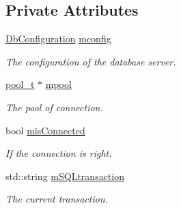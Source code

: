 \subsection*{Private Attributes}
\begin{DoxyCompactItemize}
\item 
\hypertarget{classPOSTGREDatabase_a83b42bf33f2daccada9d726d8100b3e5}{
\hyperlink{classDbConfiguration}{DbConfiguration} \hyperlink{classPOSTGREDatabase_a83b42bf33f2daccada9d726d8100b3e5}{mconfig}}
\label{classPOSTGREDatabase_a83b42bf33f2daccada9d726d8100b3e5}

\begin{DoxyCompactList}\small\item\em The configuration of the database server. \item\end{DoxyCompactList}\item 
\hypertarget{classPOSTGREDatabase_a85ab525b03e95ac8871bcc9d5601f641}{
\hyperlink{structPOSTGREDatabase_1_1pool__t}{pool\_\-t} $\ast$ \hyperlink{classPOSTGREDatabase_a85ab525b03e95ac8871bcc9d5601f641}{mpool}}
\label{classPOSTGREDatabase_a85ab525b03e95ac8871bcc9d5601f641}

\begin{DoxyCompactList}\small\item\em The pool of connection. \item\end{DoxyCompactList}\item 
\hypertarget{classPOSTGREDatabase_aa4f59d325b41b9b328878323c9589ac4}{
bool \hyperlink{classPOSTGREDatabase_aa4f59d325b41b9b328878323c9589ac4}{misConnected}}
\label{classPOSTGREDatabase_aa4f59d325b41b9b328878323c9589ac4}

\begin{DoxyCompactList}\small\item\em If the connection is right. \item\end{DoxyCompactList}\item 
\hypertarget{classPOSTGREDatabase_a8be0fe1af42ae6713524210d5e623a3a}{
std::string \hyperlink{classPOSTGREDatabase_a8be0fe1af42ae6713524210d5e623a3a}{mSQLtransaction}}
\label{classPOSTGREDatabase_a8be0fe1af42ae6713524210d5e623a3a}

\begin{DoxyCompactList}\small\item\em The current transaction. \item\end{DoxyCompactList}\end{DoxyCompactItemize}


